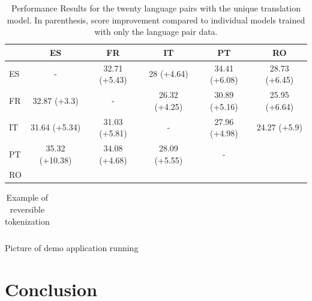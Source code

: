 \documentclass[11pt]{article}
\begin{document}
\begin{table}
  \small \centering
  \begin{tabular}{lccccc}
    \toprule
          & ES & FR & IT & PT & RO \\
    \midrule
ES	& - & 32.71 (+5.43)	 & 28 (+4.64) & 34.41 (+6.08) & 28.73 (+6.45) \\ 
FR	& 32.87 (+3.3)	& -  & 26.32 (+4.25)	 & 30.89 (+5.16) & 25.95 (+6.64) \\
IT     & 31.64 (+5.34)	 & 31.03 (+5.81) & - & 27.96 (+4.98) & 24.27 (+5.9) \\
PT	& 35.32 (+10.38) & 34.08 (+4.68) & 28.09 (+5.55) & - & \\
RO	&				\\
    \bottomrule
  \end{tabular}
  \label{tab:esfritptro}
  \caption{Performance Results for the twenty language pairs with the unique translation model. In parenthesis, score improvement compared to individual models trained with only the language pair data.}
\end{table}

\begin{table}
  \small \centering
  \begin{tabular}{lccccc}
    \toprule
    \midrule

    \bottomrule
  \end{tabular}
  \label{tab:token}
  \caption{Example of reversible tokenization}
\end{table}


Picture of demo application running 

\section{Conclusion}




\end{document}
